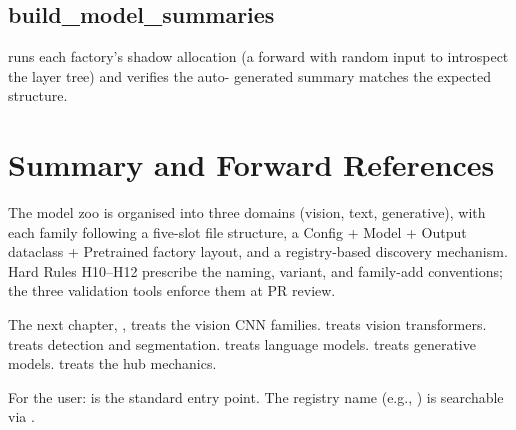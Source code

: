 \subsection{build\_model\_summaries}
\label{ssec:zoo_architecture:build_summaries}

runs each factory's shadow allocation (a forward with random
input to introspect the layer tree) and verifies the auto-
generated summary matches the expected structure.

\section{Summary and Forward References}
\label{sec:zoo_architecture:summary}

The model zoo is organised into three domains (vision, text,
generative), with each family following a five-slot file
structure, a Config + Model + Output dataclass + Pretrained
factory layout, and a registry-based discovery mechanism. Hard
Rules H10--H12 prescribe the naming, variant, and family-add
conventions; the three validation tools enforce them at PR
review.

The next chapter, , treats the vision CNN
families.  treats vision
transformers.  treats
detection and segmentation.  treats
language models.  treats generative
models.  treats the hub mechanics.

\begin{lucidnote}
For the user: 
is the standard entry point. The registry name (e.g.,
) is searchable via .
\end{lucidnote}
